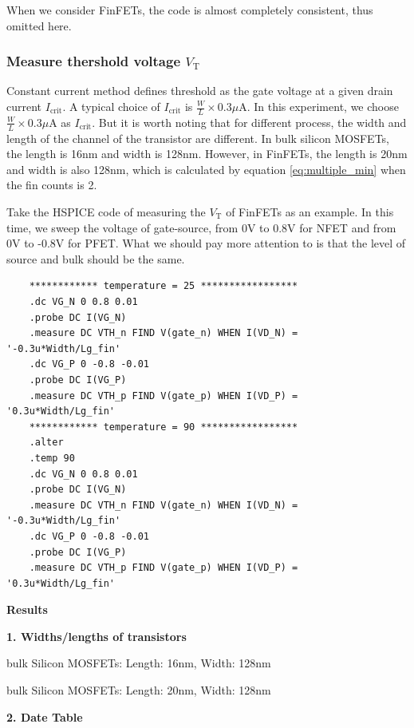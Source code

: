 \documentclass[UTF8,12pt,a4paper]{article}
\begin{document}
When we consider FinFETs, the code is almost completely consistent, thus omitted here.

\subsubsection{Measure thershold voltage $V_{\text{T}}$}

Constant current method defines threshold as the gate voltage at a given drain current $I_{\text{crit}}$. A typical choice of $I_{\text{crit}}$ is $\frac{W}{L}\times 0.3\mu \text{A}$. In this experiment, we choose $\frac{W}{L}\times 0.3\mu \text{A}$ as $I_{\text{crit}}$. But it is worth noting that for different process, the width and length of the channel of the transistor are different. In bulk silicon MOSFETs, the length is 16nm and width is 128nm. However, in FinFETs, the length is 20nm and width is also 128nm, which is calculated by equation \eqref{eq:multiple_min} when the fin counts is 2.

Take the HSPICE code of measuring the $V_{\text{T}}$ of FinFETs as an example. In this time, we sweep the voltage of gate-source, from 0V to 0.8V for NFET and from 0V to -0.8V for PFET. What we should pay more attention to is that the level of source and bulk should be the same.
\begin{lstlisting}
    ************ temperature = 25 *****************
    .dc VG_N 0 0.8 0.01
    .probe DC I(VG_N)
    .measure DC VTH_n FIND V(gate_n) WHEN I(VD_N) = '-0.3u*Width/Lg_fin'
    .dc VG_P 0 -0.8 -0.01
    .probe DC I(VG_P)
    .measure DC VTH_p FIND V(gate_p) WHEN I(VD_P) = '0.3u*Width/Lg_fin'
    ************ temperature = 90 *****************
    .alter
    .temp 90
    .dc VG_N 0 0.8 0.01
    .probe DC I(VG_N)
    .measure DC VTH_n FIND V(gate_n) WHEN I(VD_N) = '-0.3u*Width/Lg_fin'
    .dc VG_P 0 -0.8 -0.01 
    .probe DC I(VG_P)
    .measure DC VTH_p FIND V(gate_p) WHEN I(VD_P) = '0.3u*Width/Lg_fin'
\end{lstlisting}


\textbf{Results}

\textbf{1. Widths/lengths of transistors} 

bulk Silicon MOSFETs: Length: 16nm, Width: 128nm

bulk Silicon MOSFETs: Length: 20nm, Width: 128nm

\textbf{2. Date Table} 
\end{document}
